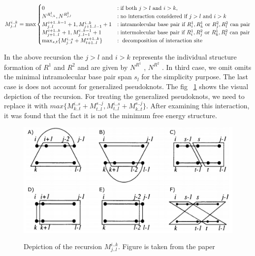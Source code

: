 \documentclass[twoside,a4paper]{report}
\begin{document}
	 \begin{equation}
	 \label{eq:3}
	M^{i..k}_{j..l} = \max \begin{cases}
	0 & : \text{if both $j > l $  and $ i > k $}, \\
	N^{R^1_{i,k}} , N^{R^2_{j,l}} & : \text{no interaction considered if $j > l $  and $ i > k $} \\
	M^{i+1..k-1}_{j..l}+1 , M^{i..k}_{j+1..l-1}+1 & : \text{intramolecular base pair if $R^1_i, R^1_k $  or $ R^2_j , R^2_l$ can pair}  \\
	M^{i+1..k}_{j+1..l}+1 , M^{i..k-1}_{j..l-1}+1 & : \text{intermolecular base pair if $R^1_i, R^2_j $  or $ R^1_k , R^2_l$ can pair} \\
	\max_{s,t} \{ 
	M^{i..s}_{j..t} + 	M^{s+1..k}_{t+1..l} \} & : \text{ decomposition of interaction site}\\
	\end{cases}
	\end{equation}
	
	In the above recursion the $j > l $  and $ i > k $ represents the individual structure formation of $R^1$ and $R^2$ and are given by $N^{R^1}$ , $N^{R^2}$ . In third case, we omit omits the minimal intramolecular base pair span $s_l$ for the simplicity purpose. The last case is does not account for generalized pseudoknots. The fig ~\ref{fig:iris} shows the visual depiction of the recursion. For treating the generalized pseudoknots, we need to replace it with $max \{ M^{i..s}_{k..t} + 	M^{s..j}_{t..l} , M^{i..s}_{t..l} + 	M^{s..j}_{k..t}\}$. After examining this interaction, it was found that the fact it is not the minimum free energy structure.\\
	
	\begin{figure}[H]
		\includegraphics[width=1.0\linewidth]{iris}
		\centering
		\caption{ Depiction of the recursion $M^{i..k}_{j..l}$. Figure is taken from the paper} 
		\citep{wright2018structure}
		\label{fig:iris}
	\end{figure}
	
\end{document}

